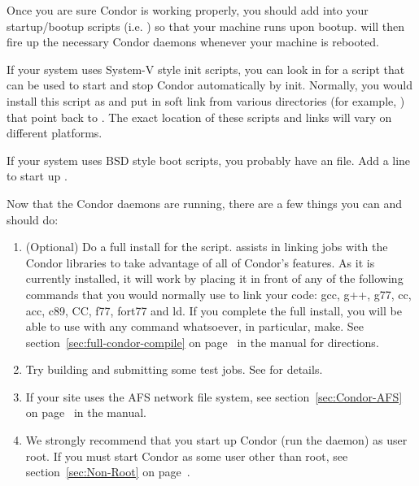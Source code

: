 Once you are sure Condor is working properly, you should add
 into your startup/bootup scripts (i.e.  ) so
that your machine runs  upon bootup.  
will then fire up the necessary Condor daemons whenever your machine
is rebooted.  

If your system uses System-V style init scripts, you can look in
 for a script that can be used
to start and stop Condor automatically by init.  Normally, you would
install this script as  and put in soft link from
various directories (for example, ) that point back to
.  The exact location of these scripts and links
will vary on different platforms.

If your system uses BSD style boot scripts, you probably have an
 file.  Add a line to start up
.


Now that the Condor daemons are running, there are a few things you
can and should do:

\begin{enumerate}
\item (Optional) Do a full install for the  script.
     assists in linking jobs with the Condor libraries
    to take advantage of all of Condor's features.  As it is currently
    installed, it will work by placing it in front of any of the
    following commands that you would normally use to link your code:
    gcc, g++, g77, cc, acc, c89, CC, f77, fort77 and ld.  If you
    complete the full install, you will be able to use
     with any command whatsoever, in particular, make.
    See section~\ref{sec:full-condor-compile} on
    page~\pageref{sec:full-condor-compile} in the manual for
    directions.

\item Try building and submitting some test jobs.  See
     for details.

\item If your site uses the AFS network file system, see
section~\ref{sec:Condor-AFS} on page~\pageref{sec:Condor-AFS} in the
manual.

\item We strongly recommend that you start up Condor (run the
 daemon) as user root.  If you must start Condor as
some user other than root, see section~\ref{sec:Non-Root} on
page~\pageref{sec:Non-Root}.

\end{enumerate}

